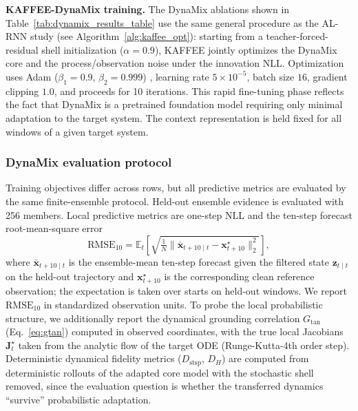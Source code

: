 \documentclass{article}
\theoremstyle{plain}
\theoremstyle{definition}
\theoremstyle{remark}
\begin{document}
\textbf{KAFFEE-DynaMix training.} The DynaMix ablations shown in Table~\ref{tab:dynamix_results_table} use the same general procedure as the AL-RNN study (see Algorithm~\ref{alg:kaffee_opt}): starting from a teacher-forced-residual shell initialization ($\alpha=0.9$), KAFFEE jointly optimizes the DynaMix core and the process/observation noise under the innovation NLL. Optimization uses Adam ($\beta_1 = 0.9$, $\beta_2 = 0.999$) \citep{kingma2014adam}, learning rate $5\times10^{-5}$, batch size $16$, gradient clipping $1.0$, and proceeds for 10 iterations. This rapid fine-tuning phase reflects the fact that DynaMix is a pretrained foundation model requiring only minimal adaptation to the target system. The context representation is held fixed for all windows of a given target system.

\subsubsection{DynaMix evaluation protocol}
\label{app:dynamix_practical_eval}

Training objectives differ across rows, but all predictive metrics are evaluated by the same finite-ensemble protocol. Held-out ensemble evidence is evaluated with 256 members. Local predictive metrics are one-step NLL and the ten-step forecast root-mean-square error
\begin{equation}
\label{eq:rmse_10}
\mathrm{RMSE}_{10} = \mathbb{E}_{t}\!\left[\sqrt{\tfrac{1}{N}\big\|\bar{\bm x}_{t+10\mid t}-\bm x^\star_{t+10}\big\|_2^2}\right],
\end{equation}
where $\bar{\bm x}_{t+10\mid t}$ is the ensemble-mean ten-step forecast given the filtered state $\bm z_{t\mid t}$ on the held-out trajectory and $\bm x^\star_{t+10}$ is the corresponding clean reference observation; the expectation is taken over starts on held-out windows. We report $\mathrm{RMSE}_{10}$ in standardized observation units. To probe the local probabilistic structure, we additionally report the dynamical grounding correlation $G_{\mathrm{tan}}$ (Eq.~\ref{eq:gtan}) computed in observed coordinates, with the true local Jacobians $\bm J^\star_t$ taken from the analytic flow of the target ODE (Runge-Kutta-4th order step). Deterministic dynamical fidelity metrics ($D_{\mathrm{stsp}}$, $D_H$) are computed from deterministic rollouts of the adapted core model with the stochastic shell removed, since the evaluation question is whether the transferred dynamics ``survive'' probabilistic adaptation.
\end{document}

